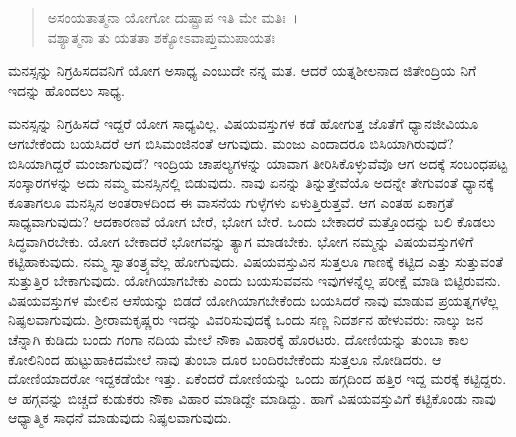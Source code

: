 \begin{verse}
ಅಸಂಯತಾತ್ಮನಾ ಯೋಗೋ ದುಷ್ಪ್ರಾಪ ಇತಿ ಮೇ ಮತಿಃ~।\\ವಶ್ಯಾತ್ಮನಾ ತು ಯತತಾ ಶಕ್ಯೋಽವಾಪ್ತುಮುಪಾಯತಃ 
\end{verse}

{\small ಮನಸ್ಸನ್ನು ನಿಗ್ರಹಿಸದವನಿಗೆ ಯೋಗ ಅಸಾಧ್ಯ ಎಂಬುದೇ ನನ್ನ ಮತ. ಆದರೆ ಯತ್ನಶೀಲನಾದ ಜಿತೇಂದ್ರಿಯ ನಿಗೆ ಇದನ್ನು ಹೊಂದಲು ಸಾಧ್ಯ.}

ಮನಸ್ಸನ್ನು ನಿಗ್ರಹಿಸದೆ ಇದ್ದರೆ ಯೋಗ ಸಾಧ್ಯವಿಲ್ಲ. ವಿಷಯವಸ್ತುಗಳ ಕಡೆ ಹೋಗುತ್ತ ಜೊತೆಗೆ ಧ್ಯಾನಜೀವಿಯೂ ಆಗಬೇಕೆಂದು ಬಯಸಿದರೆ ಆಗ ಬಿಸಿಮಂಜಿನಂತೆ ಆಗುವುದು. ಮಂಜು ಎಂದಾದರೂ ಬಿಸಿಯಾಗಿರುವುದೆ? ಬಿಸಿಯಾಗಿದ್ದರೆ ಮಂಜಾಗುವುದೆ? ಇಂದ್ರಿಯ ಚಾಪಲ್ಯಗಳನ್ನು ಯಾವಾಗ ತೀರಿಸಿಕೊಳ್ಳುವೆವೊ ಆಗ ಅದಕ್ಕೆ ಸಂಬಂಧಪಟ್ಟ ಸಂಸ್ಕಾರಗಳನ್ನು ಅದು ನಮ್ಮ ಮನಸ್ಸಿನಲ್ಲಿ ಬಿಡುವುದು. ನಾವು ಏನನ್ನು ತಿನ್ನುತ್ತೇವೆಯೊ ಅದನ್ನೇ ತೇಗುವಂತೆ ಧ್ಯಾನಕ್ಕೆ ಕೂತಾಗಲೂ ಮನಸ್ಸಿನ ಅಂತರಾಳದಿಂದ ಈ ವಾಸನೆಯ ಗುಳ್ಳೆಗಳು ಏಳುತ್ತಿರುತ್ತವೆ. ಆಗ ಎಂತಹ ಏಕಾಗ್ರತೆ ಸಾಧ್ಯವಾಗುವುದು? ಆದಕಾರಣವೆ ಯೋಗ ಬೇರೆ, ಭೋಗ ಬೇರೆ. ಒಂದು ಬೇಕಾದರೆ ಮತ್ತೊಂದನ್ನು ಬಲಿ ಕೊಡಲು ಸಿದ್ಧವಾಗಿರಬೇಕು. ಯೋಗ ಬೇಕಾದರೆ ಭೋಗವನ್ನು ತ್ಯಾಗ ಮಾಡಬೇಕು. ಭೋಗ ನಮ್ಮನ್ನು ವಿಷಯವಸ್ತುಗಳಿಗೆ ಕಟ್ಟಿಹಾಕುವುದು. ನಮ್ಮ ಸ್ವಾತಂತ್ರ್ಯವೆಲ್ಲ ಹೋಗುವುದು. ವಿಷಯವಸ್ತುವಿನ ಸುತ್ತಲೂ ಗಾಣಕ್ಕೆ ಕಟ್ಟಿದ ಎತ್ತು ಸುತ್ತುವಂತೆ ಸುತ್ತುತ್ತಿರ ಬೇಕಾಗುವುದು. ಯೋಗಿಯಾಗಬೇಕು ಎಂದು ಬಯಸುವವನು ಇವುಗಳನ್ನೆಲ್ಲ ಪರೀಕ್ಷೆ ಮಾಡಿ ಬಿಟ್ಟಿರುವನು. ವಿಷಯವಸ್ತುಗಳ ಮೇಲಿನ ಆಸೆಯನ್ನು ಬಿಡದೆ ಯೋಗಿಯಾಗಬೇಕೆಂದು ಬಯಸಿದರೆ ನಾವು ಮಾಡುವ ಪ್ರಯತ್ನಗಳೆಲ್ಲ ನಿಷ್ಫಲವಾಗುವುದು. ಶ‍್ರೀರಾಮಕೃಷ್ಣರು ಇದನ್ನು ವಿವರಿಸುವುದಕ್ಕೆ ಒಂದು ಸಣ್ಣ ನಿದರ್ಶನ ಹೇಳುವರು: ನಾಲ್ಕು ಜನ ಚೆನ್ನಾಗಿ ಕುಡಿದು ಬಂದು ಗಂಗಾ ನದಿಯ ಮೇಲೆ ನೌಕಾ ವಿಹಾರಕ್ಕೆ ಹೊರಟರು. ದೋಣಿಯನ್ನು ತುಂಬಾ ಕಾಲ ಕೋಲಿನಿಂದ ಹುಟ್ಟುಹಾಕಿದಮೇಲೆ ನಾವು ತುಂಬಾ ದೂರ ಬಂದಿರಬೇಕೆಂದು ಸುತ್ತಲೂ ನೋಡಿದರು. ಆ ದೋಣಿಯಾದರೋ ಇದ್ದಕಡೆಯೇ ಇತ್ತು. ಏಕೆಂದರೆ ದೋಣಿಯನ್ನು ಒಂದು ಹಗ್ಗದಿಂದ ಹತ್ತಿರ ಇದ್ದ ಮರಕ್ಕೆ ಕಟ್ಟಿದ್ದರು. ಆ ಹಗ್ಗವನ್ನು ಬಿಚ್ಚದೆ ಕುಡುಕರು ನೌಕಾ ವಿಹಾರ ಮಾಡಿದ್ದೇ ಮಾಡಿದ್ದು. ಹಾಗೆ ವಿಷಯವಸ್ತುವಿಗೆ ಕಟ್ಟಿಕೊಂಡು ನಾವು ಆಧ್ಯಾತ್ಮಿಕ ಸಾಧನೆ ಮಾಡುವುದು ನಿಷ್ಫಲವಾಗುವುದು.


